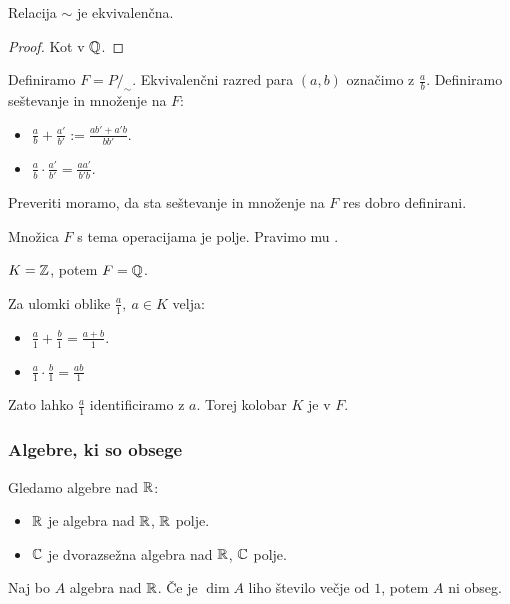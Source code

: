 \begin{trditev}
    Relacija $\sim$ je ekvivalenčna.
\end{trditev}

\begin{proof}
    Kot v $\mathbb{Q}$.
\end{proof}

Definiramo $F = P/_\sim$. Ekvivalenčni razred para $(a,b)$ označimo z $\frac{a}{b}$. Definiramo seštevanje in množenje na $F$:
\begin{itemize}
    \item $\frac{a}{b} + \frac{a'}{b'} := \frac{ab' + a'b}{bb'}$.
    \item $\frac{a}{b} \cdot \frac{a'}{b'} = \frac{aa'}{b'b}$.
\end{itemize}
Preveriti moramo, da sta seštevanje in množenje na $F$ res dobro definirani.
\begin{trditev}
    Množica $F$ s tema operacijama je polje. Pravimo mu .
\end{trditev}

\begin{primer}
    $K = \mathbb{Z}$, potem $F = \mathbb{Q}$.
\end{primer}

\begin{opomba}
    Za ulomki oblike $\frac{a}{1}, \ a \in K$ velja:
    \begin{itemize}
        \item $\frac{a}{1} + \frac{b}{1} = \frac{a+b}{1}$.
        \item $\frac{a}{1} \cdot \frac{b}{1} = \frac{ab}{1}$
    \end{itemize}
    Zato lahko $\frac{a}{1}$ identificiramo z $a$. Torej kolobar $K$ je  v $F$.
\end{opomba}

\subsubsection*{Algebre, ki so obsege}
Gledamo algebre nad $\mathbb{R}$:
\begin{itemize}
    \item $\mathbb{R}$ je algebra nad $\mathbb{R}$, $\mathbb{R}$ polje.
    \item $\mathbb{C}$ je dvorazsežna algebra nad $\mathbb{R}$, $\mathbb{C}$ polje.
\end{itemize}

\begin{trditev}
    Naj bo $A$ algebra nad $\mathbb{R}$. Če je $\dim A$ liho število večje od $1$, potem $A$ ni obseg.
\end{trditev}

